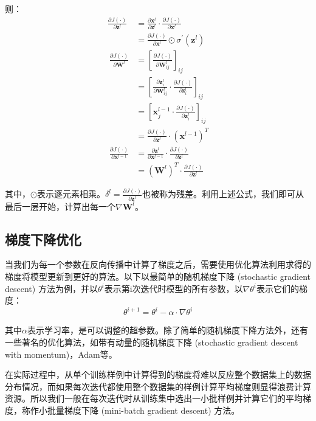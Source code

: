 则：
\begin{align}
    \frac{\partial J\left(\cdot\right)}{\partial\bm{z}^l}&=\frac{\partial\bm{x}^l}{\partial\bm{z}^l}\cdot\frac{\partial J\left(\cdot\right)}{\partial\bm{x}^l}\\
    &=\frac{\partial J\left(\cdot\right)}{\partial\bm{x}^l}\odot\sigma^\prime\left(\bm{z}^l\right)\\
\
    \frac{\partial J\left(\cdot\right)}{\partial\bm{W}^l}&=\left[\frac{\partial J\left(\cdot\right)}{\partial\bm{W}_{ij}^l}\right]_{ij}\\
    &=\left[\frac{\partial\bm{z}_i^l}{\partial\bm{W}_{ij}^l}\cdot\frac{\partial J\left(\cdot\right)}{\partial\bm{z}_i^l}\right]_{ij}\\
    &=\left[\bm{x}_j^{l-1}\cdot\frac{\partial J\left(\cdot\right)}{\partial\bm{z}_i^l}\right]_{ij}\\
    &=\frac{\partial J\left(\cdot\right)}{\partial\bm{z}^l}\cdot\left(\bm{x}^{l-1}\right)^T\\
\
    \frac{\partial J\left(\cdot\right)}{\partial\bm{x}^{l-1}}&=\frac{\partial\bm{z}^l}{\partial\bm{x}^{l-1}}\cdot\frac{\partial J\left(\cdot\right)}{\partial\bm{z}^l}\\
    &=\left(\bm{W}^l\right)^T\cdot\frac{\partial J\left(\cdot\right)}{\partial\bm{z}^l}
\end{align}

其中，$\odot$表示逐元素相乘。$\delta^l=\frac{\partial J\left(\cdot\right)}{\partial\bm{z}^l}$也被称为残差。利用上述公式，我们即可从最后一层开始，计算出每一个$\nabla\bm{W}^l$。

\subsection{梯度下降优化}

当我们为每一个参数在反向传播中计算了梯度之后，需要使用优化算法利用求得的梯度将模型更新到更好的算法。以下以最简单的随机梯度下降 (stochastic gradient descent) 方法为例，并以$\theta^i$表示第i次迭代时模型的所有参数，以$\nabla\theta^i$表示它们的梯度：
\begin{equation}
    \theta^{i+1}=\theta^i-\alpha\cdot\nabla\theta^i
\end{equation}

其中$\alpha$表示学习率，是可以调整的超参数。除了简单的随机梯度下降方法外，还有一些著名的优化算法，如带有动量的随机梯度下降 (stochastic gradient descent with momentum)，Adam\cite{Adam14}等。

在实际过程中，从单个训练样例中计算得到的梯度将难以反应整个数据集上的数据分布情况，而如果每次迭代都使用整个数据集的样例计算平均梯度则显得浪费计算资源。所以我们一般在每次迭代时从训练集中选出一小批样例并计算它们的平均梯度，称作小批量梯度下降 (mini-batch gradient descent) 方法。

